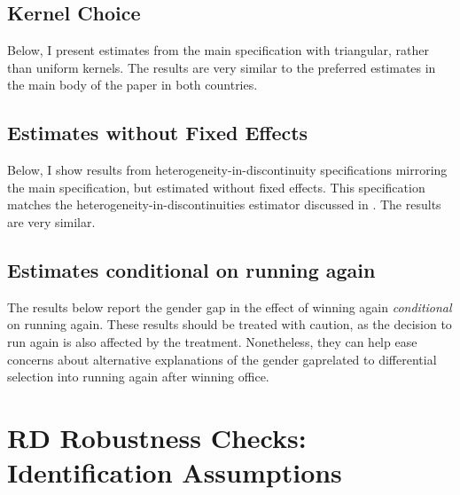 \documentclass[12pt]{article}
\begin{document}
\clearpage
\pagebreak

\subsection{Kernel Choice}
\label{app:kernelchoice}

Below, I present estimates from the main specification with triangular, rather than uniform kernels. The results are very similar to the preferred estimates in the main body of the paper in both countries.





\clearpage
\pagebreak

\subsection{Estimates without Fixed Effects}
\label{app:nofe}

Below, I show results from heterogeneity-in-discontinuity specifications mirroring the main specification, but estimated without fixed effects. This specification matches the heterogeneity-in-discontinuities estimator discussed in \citet{bansak2022}. The results are very similar.





\clearpage

\subsection{Estimates conditional on running again}

The results below report the gender gap in the effect of winning again \emph{conditional} on running again. These results should be treated with caution, as the decision to run again is also affected by the treatment. Nonetheless, they can help ease concerns about alternative explanations of the gender gaprelated to differential selection into running again after winning office.





\clearpage


\pagebreak

\section{RD Robustness Checks: Identification Assumptions}
\end{document}
